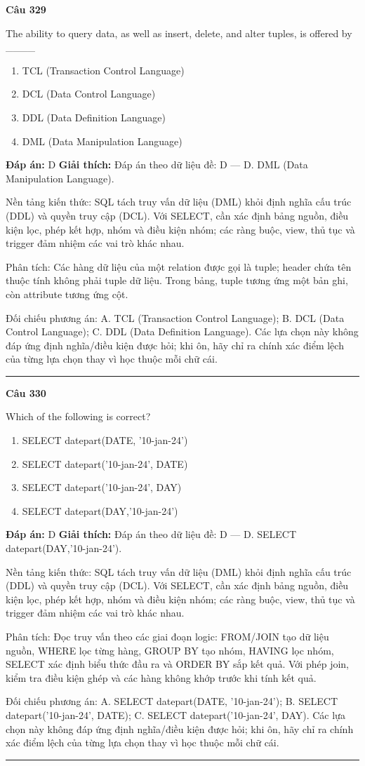 \documentclass[11pt,a4paper]{article}
\newenvironment{question}[1]{%
  \par\vspace{1em}\noindent\textbf{\large Câu #1}\par\vspace{0.4em}
}{%
  \par\vspace{1em}\hrule\vspace{0.6em}
}
\newenvironment{choices}{%
  \begin{enumerate}[label=\textbf{\Alph*.},leftmargin=2.2em,itemsep=2pt,topsep=3pt]
}{%
  \end{enumerate}
}
\newcommand{\choice}{\item}
\begin{document}
\begin{question}{329}
The ability to query data, as well as insert, delete, and alter tuples, is offered by ____
\begin{choices}
\choice TCL (Transaction Control Language)
\choice DCL (Data Control Language)
\choice DDL (Data Definition Language)
\choice DML (Data Manipulation Language)
\end{choices}
\textbf{Đáp án:} D
\textbf{Giải thích:} Đáp án theo dữ liệu đề: D — D. DML (Data Manipulation Language).

Nền tảng kiến thức: SQL tách truy vấn dữ liệu (DML) khỏi định nghĩa cấu trúc (DDL) và quyền truy cập (DCL). Với SELECT, cần xác định bảng nguồn, điều kiện lọc, phép kết hợp, nhóm và điều kiện nhóm; các ràng buộc, view, thủ tục và trigger đảm nhiệm các vai trò khác nhau.

Phân tích: Các hàng dữ liệu của một relation được gọi là tuple; header chứa tên thuộc tính không phải tuple dữ liệu. Trong bảng, tuple tương ứng một bản ghi, còn attribute tương ứng cột.

Đối chiếu phương án: A. TCL (Transaction Control Language); B. DCL (Data Control Language); C. DDL (Data Definition Language). Các lựa chọn này không đáp ứng định nghĩa/điều kiện được hỏi; khi ôn, hãy chỉ ra chính xác điểm lệch của từng lựa chọn thay vì học thuộc mỗi chữ cái.
\end{question}

\begin{question}{330}
Which of the following is correct?
\begin{choices}
\choice SELECT datepart(DATE, '10-jan-24')
\choice SELECT datepart('10-jan-24', DATE)
\choice SELECT datepart('10-jan-24', DAY)
\choice SELECT datepart(DAY,'10-jan-24')
\end{choices}
\textbf{Đáp án:} D
\textbf{Giải thích:} Đáp án theo dữ liệu đề: D — D. SELECT datepart(DAY,'10-jan-24').

Nền tảng kiến thức: SQL tách truy vấn dữ liệu (DML) khỏi định nghĩa cấu trúc (DDL) và quyền truy cập (DCL). Với SELECT, cần xác định bảng nguồn, điều kiện lọc, phép kết hợp, nhóm và điều kiện nhóm; các ràng buộc, view, thủ tục và trigger đảm nhiệm các vai trò khác nhau.

Phân tích: Đọc truy vấn theo các giai đoạn logic: FROM/JOIN tạo dữ liệu nguồn, WHERE lọc từng hàng, GROUP BY tạo nhóm, HAVING lọc nhóm, SELECT xác định biểu thức đầu ra và ORDER BY sắp kết quả. Với phép join, kiểm tra điều kiện ghép và các hàng không khớp trước khi tính kết quả.

Đối chiếu phương án: A. SELECT datepart(DATE, '10-jan-24'); B. SELECT datepart('10-jan-24', DATE); C. SELECT datepart('10-jan-24', DAY). Các lựa chọn này không đáp ứng định nghĩa/điều kiện được hỏi; khi ôn, hãy chỉ ra chính xác điểm lệch của từng lựa chọn thay vì học thuộc mỗi chữ cái.
\end{question}
\end{document}
